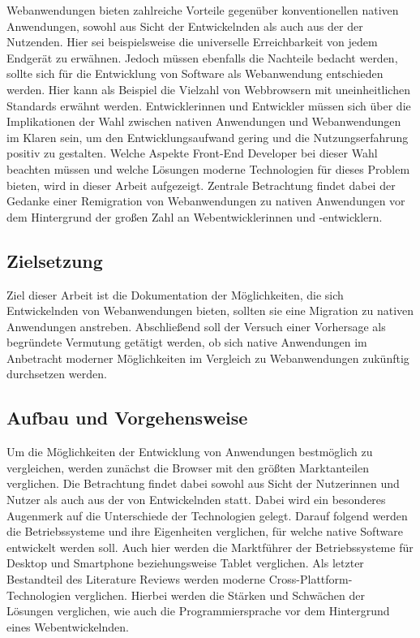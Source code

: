 \documentclass[a4paper]{scrartcl}
\begin{document}
Webanwendungen bieten zahlreiche Vorteile gegenüber konventionellen nativen Anwendungen, sowohl aus Sicht der Entwickelnden als auch aus der der Nutzenden. Hier sei beispielsweise die universelle Erreichbarkeit von jedem Endgerät zu erwähnen. Jedoch müssen ebenfalls die Nachteile bedacht werden, sollte sich für die Entwicklung von Software als Webanwendung entschieden werden. Hier kann als Beispiel die Vielzahl von Webbrowsern mit uneinheitlichen Standards erwähnt werden. Entwicklerinnen und Entwickler müssen sich über die Implikationen der Wahl zwischen nativen Anwendungen und Webanwendungen im Klaren sein, um den Entwicklungsaufwand gering und die Nutzungserfahrung positiv zu gestalten. Welche Aspekte Front-End Developer bei dieser Wahl beachten müssen und welche Lösungen moderne Technologien für dieses Problem bieten, wird in dieser Arbeit aufgezeigt. Zentrale Betrachtung findet dabei der Gedanke einer Remigration von Webanwendungen zu nativen Anwendungen vor dem Hintergrund der großen Zahl an Webentwicklerinnen und -entwicklern.

\newpage

\subsection{Zielsetzung}
Ziel dieser Arbeit ist die Dokumentation der Möglichkeiten, die sich Entwickelnden von Webanwendungen bieten, sollten sie eine Migration zu nativen Anwendungen anstreben. Abschließend soll der Versuch einer Vorhersage als begründete Vermutung getätigt werden, ob sich native Anwendungen im Anbetracht moderner Möglichkeiten im Vergleich zu Webanwendungen zukünftig durchsetzen werden. 

\newpage

\subsection{Aufbau und Vorgehensweise}
Um die Möglichkeiten der Entwicklung von Anwendungen bestmöglich zu vergleichen, werden zunächst die Browser mit den größten Marktanteilen verglichen. Die Betrachtung findet dabei sowohl aus Sicht der Nutzerinnen und Nutzer als auch aus der von Entwickelnden statt. Dabei wird ein besonderes Augenmerk auf die Unterschiede der Technologien gelegt. Darauf folgend werden die Betriebssysteme und ihre Eigenheiten verglichen, für welche native Software entwickelt werden soll. Auch hier werden die Marktführer der Betriebssysteme für Desktop und Smartphone beziehungsweise Tablet verglichen. Als letzter Bestandteil des Literature Reviews werden moderne Cross-Plattform-Technologien verglichen. Hierbei werden die Stärken und Schwächen der Lösungen verglichen, wie auch die Programmiersprache vor dem Hintergrund eines Webentwickelnden. \\
\end{document}
